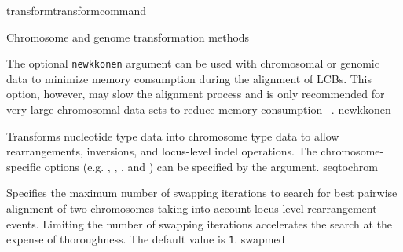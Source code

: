 \begin{command}{transform}{transformcommand}
\begin{arguments}
\begin{argumentgroup}{Chromosome and genome transformation methods}
\begin{description}

                        
                        {The optional \texttt {newkkonen} argument can be used with 
                        chromosomal or genomic data to minimize memory 
                        consumption during the alignment of LCBs.  This option, 
                        however, may slow the alignment process and is only 
                        recommended for very large chromosomal data sets to 
                        reduce memory consumption ~\cite{wheelerhonginprep}.}
                         {newkkonen}
                         
          	 {Transforms nucleotide type data into chromosome type data to allow
           	 rearrangements, inversions, and locus-level indel operations.  The
            	chromosome-specific options (e.g.  , 
            	, , and 
		) can be specified by the argument.}
                	     {seqtochrom}
           
                        {Specifies the maximum number of swapping iterations
                        to search for best pairwise alignment of two chromosomes
                        taking into account locus-level rearrangement events. 
                        Limiting the number of swapping
                        iterations accelerates the search at the expense of
                        thoroughness. The default value is \texttt{1}.}
                        {swapmed}


\end{description}
\end{argumentgroup}
\end{arguments}
\end{command}
